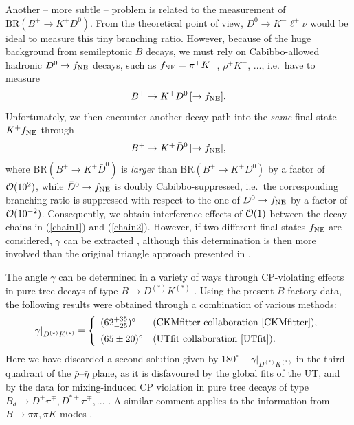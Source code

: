 \documentclass[12pt]{article}
\begin{document}
Another -- more subtle -- problem is related to the measurement of
$\mbox{BR}(B^+\to K^+D^0)$. From the theoretical point of view, 
$D^0\to K^-\ell^+\nu$ would be ideal to measure this tiny 
branching ratio. However, because of the huge background from 
semileptonic $B$ decays, we must rely on Cabibbo-allowed hadronic 
$D^0\to f_{\rm NE}$ decays, such as $f_{\rm NE}=\pi^+K^-$, $\rho^+K^-$,
$\ldots$, i.e.\ have to measure 
\begin{equation}\label{chain1}
B^+\to K^+D^0 \,[\to f_{\rm NE}].
\end{equation}
Unfortunately, we then encounter another decay path into the {\it same} 
final state $K^+ f_{\rm NE}$ through 
\begin{equation}\label{chain2}
B^+\to K^+\bar D^0 \,[\to f_{\rm NE}], 
\end{equation}
where BR$(B^+\to K^+\bar D^0)$ is {\it larger} than BR$(B^+\to K^+D^0)$
by a factor of ${\cal O}(10^2)$, while $\bar D^0\to f_{\rm NE}$ is doubly 
Cabibbo-suppressed, i.e.\ the corresponding branching ratio is suppressed
with respect to the one of $D^0\to f_{\rm NE}$ by a factor of 
${\cal O}(10^{-2})$. Consequently, we obtain interference effects of 
${\cal O}(1)$ between the decay chains in (\ref{chain1}) and (\ref{chain2}). 
However, if two different final states $f_{\rm NE}$ are considered, 
$\gamma$  can be extracted \cite{ADS}, although this determination is  
then more involved than the original triangle approach presented in 
\cite{gw}. 

The angle $\gamma$ can be determined in a variety of ways
through CP-violating effects in pure
tree decays of type $B\to D^{(*)} K^{(*)}$ \cite{WG-sum}. Using the
present $B$-factory data, the following results were obtained through a
combination of various methods:
\begin{equation}\label{gam-DK}
\left.\gamma\right|_{D^{(*)} K^{(*)}} = \left\{
\begin{array}{ll}
(62^{+35}_{-25})^\circ & \mbox{(CKMfitter collaboration
    \cite{CKMfitter}),}\\[5pt]
(65\pm 20)^\circ & \mbox{(UTfit collaboration \cite{UTfit})}.
\end{array}
\right.
\end{equation}
Here we have discarded a second solution given by $180^\circ+\left.
\gamma\right|_{D^{(*)} K^{(*)}}$
in the third quadrant of the $\bar\rho$--$\bar\eta$ plane, as it is disfavoured
by the global fits of
the UT, and by the data for mixing-induced CP violation in pure tree decays
of type
$B_d\to D^{\pm}\pi^\mp, D^{\ast\pm}\pi^\mp, ...$ \cite{RF-gam-ca}. A similar
comment applies
to the information from $B\to\pi\pi, \pi K$ modes \cite{BFRS-5}. 
\end{document}
